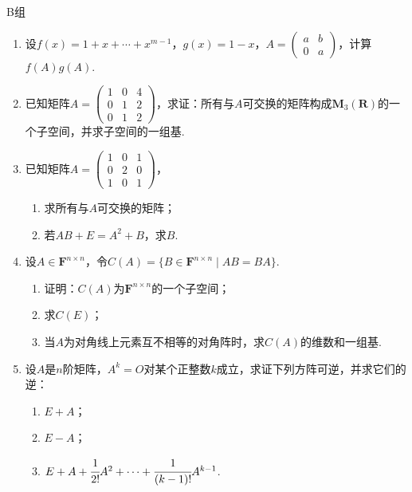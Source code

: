 \centerline{\heiti B组}
\begin{enumerate}
    \item 设$f(x)=1+x+\cdots+x^{m-1}$，$g(x)=1-x$，$A=\begin{pmatrix}
        a & b \\ 0 & a
    \end{pmatrix}$，计算$f(A)g(A)$.

    \item 已知矩阵$A=\begin{pmatrix}
                  1 & 0 & 4 \\ 0 & 1 & 2 \\ 0 & 1 & 2
              \end{pmatrix}$，求证：所有与$A$可交换的矩阵构成$\mathbf{M}_3(\mathbf{R})$的一个子空间，并求子空间的一组基.

    \item 已知矩阵$A=\begin{pmatrix}
                  1 & 0 & 1 \\ 0 & 2 & 0 \\ 1 & 0 & 1
              \end{pmatrix}$，
          \begin{enumerate}
              \item 求所有与$A$可交换的矩阵；

              \item 若$AB+E=A^2+B$，求$B$.
          \end{enumerate}

    \item 设$A \in \mathbf{F}^{n \times n}$，令$C(A)=\{B \in \mathbf{F}^{n \times n} \mid AB=BA\}$.
          \begin{enumerate}
              \item 证明：$C(A)$为$\mathbf{F}^{n \times n}$的一个子空间；

              \item 求$C(E)$；

              \item 当$A$为对角线上元素互不相等的对角阵时，求$C(A)$的维数和一组基.
          \end{enumerate}

      \item 设$A$是$n$阶矩阵，$A^k=O$对某个正整数$k$成立，求证下列方阵可逆，并求它们的逆：
    \begin{enumerate}
        \item $E+A$；
        \item $E-A$；
        \item $E+A+\cfrac{1}{2!}A^2+\cdots+\cfrac{1}{(k-1)!}A^{k-1}$.
    \end{enumerate}
\end{enumerate}

